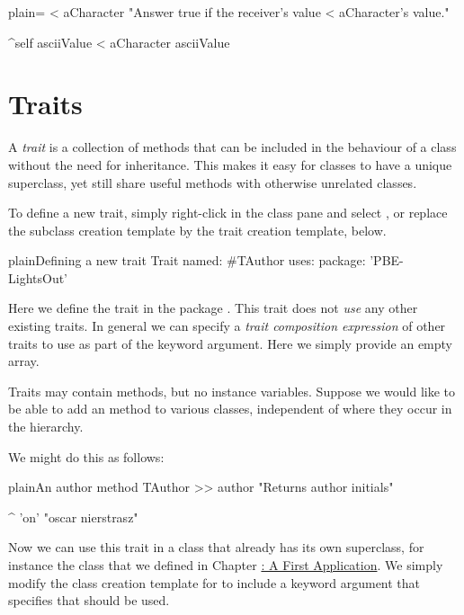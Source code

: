 \documentclass[10pt,twoside,english]{_support/latex/sbabook/sbabook}
\begin{document}
\begin{listing}[float, label=scr:characterLessThan]{plain}{=}
< aCharacter
    "Answer true if the receiver's value < aCharacter's value."

    ^self asciiValue < aCharacter asciiValue
\end{listing}
\section{Traits}
A \textit{trait} is a collection of methods that can be included in the behaviour of
a class without the need for inheritance. This makes it easy for classes to have
a unique superclass, yet still share useful methods with otherwise unrelated
classes.

To define a new trait, simply right-click in the class pane and select
, or replace the subclass creation template by the trait
creation template, below.

\begin{listing}[float, label=scr:tauthor]{plain}{Defining a new trait}
Trait named: #TAuthor
    uses: { }
    package: 'PBE-LightsOut'
\end{listing}

Here we define the trait  in the package . This
trait does not \textit{use} any other existing traits. In general we can specify a
\textit{trait composition expression} of other traits to use as part of the 
keyword argument. Here we simply provide an empty array.

Traits may contain methods, but no instance variables. Suppose we would like to
be able to add an  method to various classes, independent of where
they occur in the hierarchy.

We might do this as follows:

\begin{listing}[float, label=scr:author]{plain}{An author method}
TAuthor >> author
    "Returns author initials"

    ^ 'on'    "oscar nierstrasz"
\end{listing}

Now we can use this trait in a class that already has its own superclass, for
instance the  class that we defined in Chapter \hyperref[cha:firstApp]{: A First Application}. We
simply modify the class creation template for  to include a 
keyword argument that specifies that  should be used.
\end{document}

